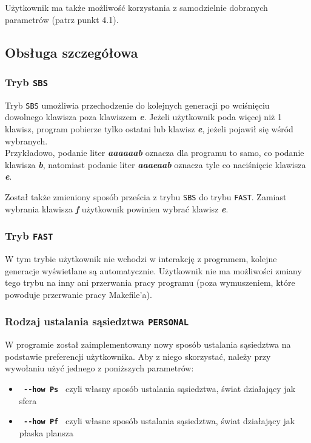 \documentclass[a4paper]{article}
\begin{document}
\quad U\.zytkownik ma tak\.ze mo\.zliwo\'s\'c korzystania z samodzielnie dobranych parametr\'ow (patrz punkt 4.1). 


\subsection{Obs\l{}uga szczeg\'o\l{}owa}
\subsubsection{Tryb \texttt{SBS}}
\quad Tryb \texttt{SBS} umo\.zliwia przechodzenie do kolejnych generacji po wci\'sni\k{e}ciu dowolnego klawisza poza klawiszem \textbf{\textit{e}}. 
Je\.zeli u\.zytkownik poda wi\k{e}cej ni\.z 1 klawisz, program pobierze tylko ostatni lub klawisz \textbf{\textit{e}}, je\.zeli pojawi\l{} si\k{e} w\'sr\'od wybranych. 
\\
Przyk\l{}adowo, podanie liter \textbf{\textit{aaaaaab}} oznacza dla programu to samo, co podanie klawisza \textbf{\textit{b}}, 
natomiast podanie liter \textbf{\textit{aaaeaab}} oznacza tyle co naci\'sni\k{e}cie klawisza \textbf{\textit{e}}. 


Zosta\l{} tak\.ze zmieniony spos\'ob prze\'scia z trybu \texttt{SBS} do trybu \texttt{FAST}. 
Zamiast wybrania klawisza \textbf{\textit{f}} u\.zytkownik powinien wybra\'c klawisz \textbf{\textit{e}}.  

\subsubsection{Tryb \texttt{FAST}}
\quad W tym trybie u\.zytkownik nie wchodzi w interakcj\k{e} z programem, kolejne generacje wy\'swietlane s\k{a} automatycznie. 
U\.zytkownik nie ma mo\.zliwo\'sci zmiany tego trybu na inny ani przerwania pracy programu (poza wymuszeniem, kt\'ore powoduje przerwanie pracy Makefile'a).

\subsubsection{Rodzaj ustalania s\k{a}siedztwa \texttt{PERSONAL}}
\quad W programie zosta\l{} zaimplementowany nowy spos\'ob ustalania s\k{a}siedztwa na podstawie preferencji u\.zytkownika. Aby z niego skorzysta\'c, nale\.zy przy wywo\l{}aniu u\.zy\'c jednego z poni\.zszych parametr\'ow:
\begin{itemize}
	\item \textbf{\texttt{ -{}-how Ps }} czyli w\l{}asny spos\'ob ustalania s\k{a}siedztwa, \'swiat dzia\l{}aj\k{a}cy jak sfera
	\item \textbf{\texttt{ -{}-how Pf }} czyli w\l{}asne spos\'ob ustalania s\k{a}siedztwa, \'swiat dzia\l{}aj\k{a}cy jak p\l{}aska plansza
\end{itemize}
\end{document}
